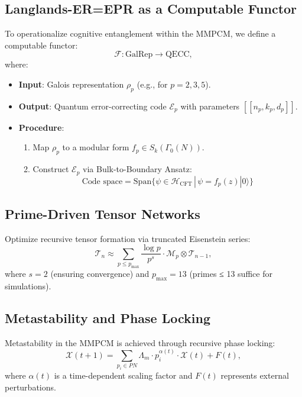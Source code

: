 \documentclass[11pt]{article}
\newcommand{\Xi}{\mathcal{X}}
\begin{document}
\subsection{Langlands-ER=EPR as a Computable Functor}
To operationalize cognitive entanglement within the MMPCM, we define a computable functor:
\begin{equation}
\mathcal{F}: \text{GalRep} \to \text{QECC},
\end{equation}
where:
\begin{itemize}
  \item \textbf{Input}: Galois representation \(\rho_p\) (e.g., for \(p=2,3,5\)).
  \item \textbf{Output}: Quantum error-correcting code \(\mathcal{E}_p\) with parameters \([[n_p, k_p, d_p]]\).
  \item \textbf{Procedure}:
    \begin{enumerate}
      \item Map \(\rho_p\) to a modular form \(f_p \in S_k(\Gamma_0(N))\).
      \item Construct \(\mathcal{E}_p\) via Bulk-to-Boundary Ansatz:
      \begin{equation}
      \text{Code space} = \text{Span}\{ \psi \in \mathcal{H}_{\text{CFT}} \,|\, \psi = f_p(z)|0\rangle \}
      \end{equation}
    \end{enumerate}
\end{itemize}

\subsection{Prime-Driven Tensor Networks}
Optimize recursive tensor formation via truncated Eisenstein series:
\begin{equation}
\mathcal{T}_n \approx \sum_{p \leq p_{\text{max}}} \frac{\log p}{p^s} \cdot \mathcal{M}_p \otimes \mathcal{T}_{n-1},
\end{equation}
where \(s = 2\) (ensuring convergence) and \(p_{\text{max}} = 13\) (primes ≤ 13 suffice for simulations).

\subsection{Metastability and Phase Locking}
Metastability in the MMPCM is achieved through recursive phase locking:
\begin{equation}
\Xi(t+1) = \sum_{p_i \in PN} \Lambda_m \cdot p_i^{\alpha(t)} \cdot \Xi(t) + F(t),
\end{equation}
where \(\alpha(t)\) is a time-dependent scaling factor and \(F(t)\) represents external perturbations.
\end{document}
